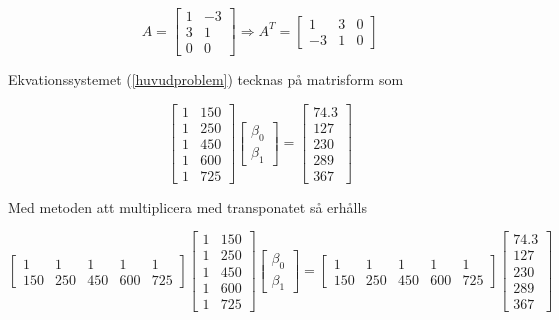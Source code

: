 \documentclass[titlepage, 10pt]{article}
\begin{document}
\begin{equation}
  A =
  \begin{bmatrix}
    1 & -3 \\
    3 &  1 \\
    0 &  0
  \end{bmatrix} \Rightarrow
  A^T =
  \begin{bmatrix}
    1 & 3 & 0 \\
    -3 &  1 & 0
  \end{bmatrix}
\end{equation}

Ekvationssystemet (\ref{huvudproblem}) tecknas på matrisform som

\begin{equation}
  \begin{bmatrix}
    1 & 150 \\
    1 & 250 \\
    1 & 450 \\
    1 & 600  \\
    1 & 725
  \end{bmatrix}
  \begin{bmatrix}
    \beta_0 \\
    \beta_1
  \end{bmatrix}
  =
  \begin{bmatrix}
    74.3 \\ 127 \\ 230 \\ 289 \\ 367
  \end{bmatrix}
\end{equation}

Med metoden att multiplicera med transponatet så erhålls

\begin{equation}
  \begin{bmatrix}
    1 & 1 & 1 & 1 & 1 \\
    150 & 250 & 450 & 600 & 725
  \end{bmatrix}
  \begin{bmatrix}
    1 & 150 \\
    1 & 250 \\
    1 & 450 \\
    1 & 600  \\
    1 & 725
  \end{bmatrix}
  \begin{bmatrix}
    \beta_0 \\
    \beta_1
  \end{bmatrix}
  =
    \begin{bmatrix}
    1 & 1 & 1 & 1 & 1 \\
    150 & 250 & 450 & 600 & 725
    \end{bmatrix}
    \begin{bmatrix}
    74.3 \\ 127 \\ 230 \\ 289 \\ 367
    \end{bmatrix}
\end{equation}
\end{document}
